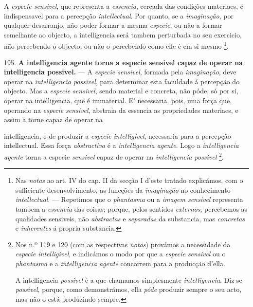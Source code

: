 A \emph{especie sensivel}, que representa a \emph{essencia}, cercada das condições materiaes, é indispensavel para a percepção \emph{intellectual}. Por quanto, se a \emph{imaginação}, por qualquer desarranjo, não poder formar a mesma \emph{especie}, ou não a formar semelhante ao objecto, a intelligencia será tambem perturbada no seu exercicio, não percebendo o objecto, ou não o percebendo como elle é em si mesmo \footnote{Nas \emph{notas} ao art. IV do cap. II da secção I d'este tratado explicámos, com o sufficiente desenvolvimento, as funcções da \emph{imaginação} no conhecimento \emph{intellectual}. --- Repetimos que o \emph{phantasma} ou a \emph{imagem sensivel} representa tambem a \emph{essencia} das coisas; porque, pelos sentidos \emph{externos}, percebemos as qualidades sensiveis, não \emph{abstractas} e \emph{separadas} da substancia, mas \emph{concretas} e \emph{inherentes} á propria substancia.}.

195. \textbf{A intelligencia agente torna a especie sensivel capaz de operar na intelligencia possivel.} --- A \emph{especie sensivel}, formada pela \emph{imaginação}, deve operar na \emph{intelligencia possivel}, para determinar esta faculdade á percepção do objecto. Mas a \emph{especie sensivel}, sendo material e concreta, não póde, só por si, operar na intelligencia, que é immaterial. E' necessaria, pois, uma força que, operando na \emph{especie sensivel}, abstraia da essencia as propriedades materiaes, e assim a torne capaz de operar na

intelligencia, e de produzir a \emph{especie intelligivel}, necessaria para a percepção intellectual. Essa força \emph{abstractiva} é a \emph{intelligencia agente}. Logo a \emph{intelligencia agente} torna a especie \emph{sensivel} capaz de operar na \emph{intelligencia possivel} \footnote{Nos n.º 119 e 120 (com as respectivas \emph{notas}) provámos a necessidade da \emph{especie intelligivel}, e indicámos o modo por que a \emph{especie sensivel} ou o \emph{phantasma} e a \emph{intelligencia agente} concorrem para a producção d'ella.\par A intelligencia \emph{possivel} é a que chamamos simplesmente \emph{intelligencia}. Diz-se \emph{possivel}, porque, como demonstrámos, ella \emph{póde} produzir sempre o seu acto, mas não o está produzindo sempre.}.

